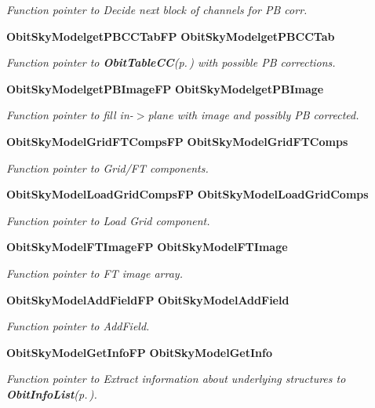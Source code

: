 \begin{CompactItemize}
\begin{CompactList}\small\item\em Function pointer to Decide next block of channels for PB corr. \item\end{CompactList}\item 
{\bf Obit\-Sky\-Modelget\-PBCCTab\-FP} {\bf Obit\-Sky\-Modelget\-PBCCTab}
\begin{CompactList}\small\item\em Function pointer to {\bf Obit\-Table\-CC}{\rm (p.\,\pageref{structObitTableCC})} with possible PB corrections. \item\end{CompactList}\item 
{\bf Obit\-Sky\-Modelget\-PBImage\-FP} {\bf Obit\-Sky\-Modelget\-PBImage}
\begin{CompactList}\small\item\em Function pointer to fill in-$>$plane with image and possibly PB corrected. \item\end{CompactList}\item 
{\bf Obit\-Sky\-Model\-Grid\-FTComps\-FP} {\bf Obit\-Sky\-Model\-Grid\-FTComps}
\begin{CompactList}\small\item\em Function pointer to Grid/FT components. \item\end{CompactList}\item 
{\bf Obit\-Sky\-Model\-Load\-Grid\-Comps\-FP} {\bf Obit\-Sky\-Model\-Load\-Grid\-Comps}
\begin{CompactList}\small\item\em Function pointer to Load Grid component. \item\end{CompactList}\item 
{\bf Obit\-Sky\-Model\-FTImage\-FP} {\bf Obit\-Sky\-Model\-FTImage}
\begin{CompactList}\small\item\em Function pointer to FT image array. \item\end{CompactList}\item 
{\bf Obit\-Sky\-Model\-Add\-Field\-FP} {\bf Obit\-Sky\-Model\-Add\-Field}
\begin{CompactList}\small\item\em Function pointer to Add\-Field. \item\end{CompactList}\item 
{\bf Obit\-Sky\-Model\-Get\-Info\-FP} {\bf Obit\-Sky\-Model\-Get\-Info}
\begin{CompactList}\small\item\em Function pointer to Extract information about underlying structures to {\bf Obit\-Info\-List}{\rm (p.\,\pageref{structObitInfoList})}. \item\end{CompactList}\end{CompactItemize}


